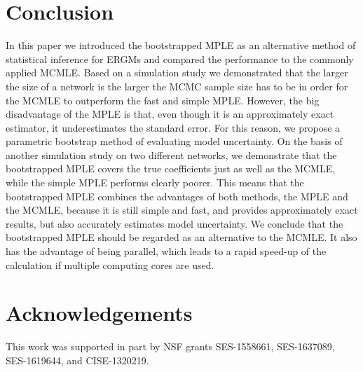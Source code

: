 \documentclass[10pt, conference, compsocconf]{IEEEtran}
\begin{document}
\section{Conclusion}

\indent In this paper we introduced the bootstrapped MPLE as an alternative method of statistical inference for ERGMs and compared the performance to the commonly applied MCMLE. Based on a simulation study we demonstrated that the larger the size of a network is the larger the MCMC sample size has to be in order for the MCMLE to outperform the fast and simple MPLE. However, the big disadvantage of the MPLE is that, even though it is an approximately exact estimator, it underestimates the standard error. For this reason, we propose a parametric bootstrap method of evaluating model uncertainty. On the basis of another simulation study on two different networks, we demonstrate that the bootstrapped MPLE covers the true coefficients just as well as the MCMLE, while the simple MPLE performs clearly poorer. This means that the bootstrapped MPLE combines the advantages of both methods, the MPLE and the MCMLE, because it is still simple and fast, and provides approximately exact results, but also accurately estimates model uncertainty. We conclude that the bootstrapped MPLE should be regarded as an alternative to the MCMLE. It also has the advantage of being parallel, which leads to a rapid speed-up of the calculation if multiple computing cores are used.

\section{Acknowledgements}
This work was supported in part by NSF grants SES-1558661, SES-1637089, SES-1619644, and CISE-1320219. 


%
%
\end{document}
